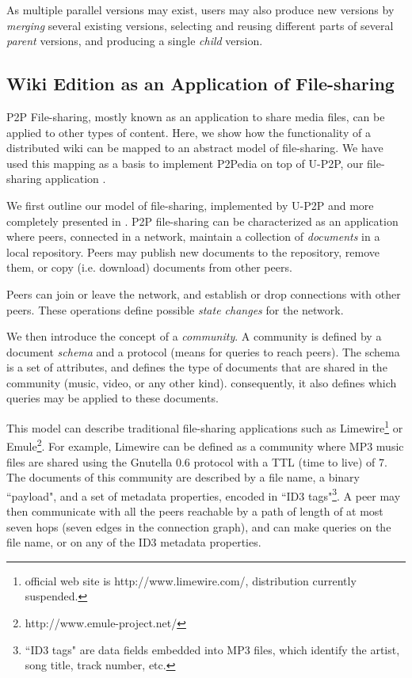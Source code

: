 As multiple parallel versions may exist, users may also produce new versions by \emph{merging} several existing versions, selecting and reusing different parts of several \emph{parent} versions, and producing a single \emph{child} version. 

\subsection{Wiki Edition as an Application of File-sharing}

P2P File-sharing, mostly known as an application to share media files, can be applied to other types of content. Here, we show how the functionality of a distributed wiki can be mapped to an abstract model of file-sharing. We have used this mapping as a basis to implement P2Pedia on top of U-P2P, our file-sharing application \cite{UP2P2002, UP2PSemelsJournal2009, UP2P:201101TechReport}.

We first outline our model of file-sharing, implemented by U-P2P and more completely presented in \cite{UP2P:201101TechReport}. P2P file-sharing can be characterized as an application where peers, connected in a network, maintain a collection of \emph{documents} in a local repository. Peers may publish new documents to the repository, remove them, or copy (i.e. download) documents from other peers.

Peers can join or leave the network, and establish or drop connections with other peers. These operations define possible \emph{state changes} for the network. 

We then introduce the concept of a \emph{community}. A community is defined by a document \emph{schema} and a protocol (means for queries to reach peers). The schema is a set of attributes, and defines the type of documents that are shared in the community (music, video, or any other kind). consequently, it also defines which queries may be applied to these documents. 

This model can describe traditional file-sharing applications such as Limewire\footnote{official web site is http://www.limewire.com/, distribution currently suspended.} or Emule\footnote{http://www.emule-project.net/}. For example, Limewire can be defined as a community where MP3 music files are shared using the Gnutella 0.6 protocol with a TTL (time to live) of 7. The documents of this community are described by a file name, a binary ``payload", and a set of metadata properties, encoded in ``ID3 tags"\footnote{``ID3 tags" are data fields embedded into MP3 files, which identify the artist, song title, track number, etc.}. A peer may then communicate with all the peers reachable by a path of length of at most seven hops (seven edges in the connection graph), and can make queries on the file name, or on any of the ID3 metadata properties. 

